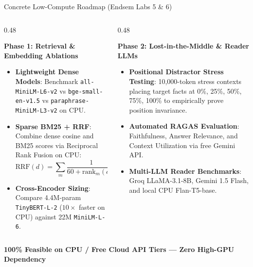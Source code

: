 \documentclass[10pt,aspectratio=169]{beamer}
\begin{document}
\begin{frame}{Concrete Low-Compute Roadmap (Endsem Labs 5 \& 6)}
    \begin{columns}[onlytextwidth,T]
        \begin{column}{0.48\textwidth}
            \begin{block}{\textbf{Phase 1: Retrieval \& Embedding Ablations}}
                \scriptsize
                \begin{itemize}\setlength\itemsep{2pt}
                    \item \textbf{Lightweight Dense Models}: Benchmark \texttt{all-MiniLM-L6-v2} vs \texttt{bge-small-en-v1.5} vs \texttt{paraphrase-MiniLM-L3-v2} on CPU.
                    \item \textbf{Sparse BM25 + RRF}: Combine dense cosine and BM25 scores via Reciprocal Rank Fusion on CPU:
                    $$\text{RRF}(d) = \sum_{m} \frac{1}{60 + \text{rank}_m(d)}$$
                    \item \textbf{Cross-Encoder Sizing}: Compare 4.4M-param \texttt{TinyBERT-L-2} ($10\times$ faster on CPU) against 22M \texttt{MiniLM-L-6}.
                \end{itemize}
            \end{block}
        \end{column}
        
        \begin{column}{0.48\textwidth}
            \begin{block}{\textbf{Phase 2: Lost-in-the-Middle \& Reader LLMs}}
                \scriptsize
                \begin{itemize}\setlength\itemsep{2pt}
                    \item \textbf{Positional Distractor Stress Testing}: 10,000-token stress contexts placing target facts at 0\%, 25\%, 50\%, 75\%, 100\% to empirically prove position invariance.
                    \item \textbf{Automated RAGAS Evaluation}: Faithfulness, Answer Relevance, and Context Utilization via free Gemini API.
                    \item \textbf{Multi-LLM Reader Benchmarks}: Groq LLaMA-3.1-8B, Gemini 1.5 Flash, and local CPU Flan-T5-base.
                \end{itemize}
            \end{block}
        \end{column}
    \end{columns}

    \vspace{0.2cm}
    \begin{center}
        \textcolor{primaryblue}{\textbf{100\% Feasible on CPU / Free Cloud API Tiers --- Zero High-GPU Dependency}}
    \end{center}
\end{frame}
\end{document}
